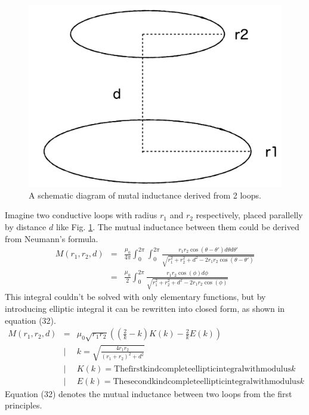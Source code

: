 \begin{figure}[H]
  \includegraphics[width=17cm, bb=9 9 900 550]{./section3Effectiveness/2CoilsExample.png}
  \caption{A schematic diagram of mutal inductance derived from 2 loops.}
  \label{fig:M}
\end{figure}
Imagine two conductive loops with radius $r_1$ and $r_2$ respectively, placed parallelly by distance $d$ like Fig. \ref{fig:M}.
The mutual inductance between them could be derived from Neumann's formula.
\begin{eqnarray}
  M(r_1, r_2, d) &=& \frac{\mu_0}{4\pi}\int_0^{2\pi}\int_0^{2\pi} \frac{r_1r_2\cos(\theta-\theta')d\theta d\theta'}{\sqrt{r_1^2 + r_2^2 + d^2 - 2r_1r_2\cos(\theta-\theta')}} \nonumber\\
  &=& \frac{\mu_0}{2}\int_0^{2\pi} \frac{r_1r_2\cos(\phi) d\phi}{\sqrt{r_1^2 + r_2^2 + d^2 - 2r_1r_2\cos(\phi)}}
\end{eqnarray}
This integral couldn't be solved with only elementary functions,
but by introducing elliptic integral it can be rewritten into closed form,
as shown in equation (32).
\begin{eqnarray}
  M(r_1, r_2, d) &=& \mu_0\sqrt{r_1r_2}\left( (\frac{2}{k}-k)K(k) - \frac{2}{k}E(k) \right)\\
  &|& k = \sqrt{\frac{4r_1r_2}{(r_1+r_2)^2 + d^2}}\nonumber\\
  &|& K(k) = \mathrm{The first kind complete elliptic integral with modulus} k\nonumber\\
  &|& E(k) = \mathrm{The second kind complete elliptic integral with modulus} k\nonumber
\end{eqnarray}
Equation (32) denotes the mutual inductance between two loops from the first principles.
